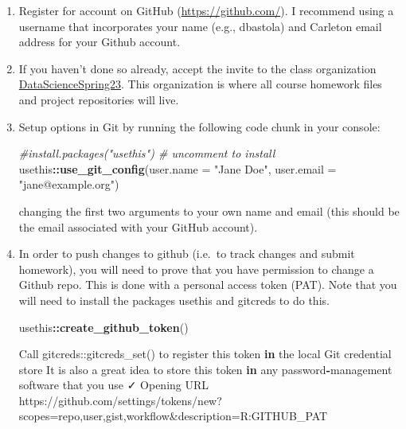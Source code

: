 \documentclass[
]{book}
\newenvironment{Shaded}{\begin{snugshade}}{\end{snugshade}}
\newcommand{\AttributeTok}[1]{\textcolor[rgb]{0.13,0.29,0.53}{#1}}
\newcommand{\CommentTok}[1]{\textcolor[rgb]{0.56,0.35,0.01}{\textit{#1}}}
\newcommand{\ControlFlowTok}[1]{\textcolor[rgb]{0.13,0.29,0.53}{\textbf{#1}}}
\newcommand{\FunctionTok}[1]{\textcolor[rgb]{0.13,0.29,0.53}{\textbf{#1}}}
\newcommand{\NormalTok}[1]{#1}
\newcommand{\SpecialCharTok}[1]{\textcolor[rgb]{0.81,0.36,0.00}{\textbf{#1}}}
\newcommand{\StringTok}[1]{\textcolor[rgb]{0.31,0.60,0.02}{#1}}
\begin{document}
\begin{enumerate}
\def\labelenumi{\arabic{enumi}.}
\item
  Register for account on GitHub (\url{https://github.com/}). I recommend
  using a username that incorporates your name (e.g., dbastola) and Carleton email address for your Github account.
\item
  If you haven't done so already, accept the invite to the class organization \href{https://github.com/DataScienceSpring23}{DataScienceSpring23}. This organization is where all course homework files and project repositories will live.
\item
  Setup options in Git by running the following code chunk in your
  console:

\begin{Shaded}
\begin{Highlighting}[]
\CommentTok{\#install.packages("usethis")  \# uncomment to install}
\NormalTok{usethis}\SpecialCharTok{::}\FunctionTok{use\_git\_config}\NormalTok{(}\AttributeTok{user.name =} \StringTok{"Jane Doe"}\NormalTok{, }\AttributeTok{user.email =} \StringTok{"jane@example.org"}\NormalTok{)}
\end{Highlighting}
\end{Shaded}

  changing the first two arguments to your own name and email (this should
  be the email associated with your GitHub account).
\item
  In order to push changes to github (i.e.~to track changes and submit homework), you will need to prove that you have permission to change a Github repo. This is done with a personal access token (PAT). Note that you will need to install the packages usethis and gitcreds to do this.

\begin{Shaded}
\begin{Highlighting}[]
\NormalTok{usethis}\SpecialCharTok{::}\FunctionTok{create\_github\_token}\NormalTok{()}
\end{Highlighting}
\end{Shaded}

\begin{Shaded}
\begin{Highlighting}[]
\NormalTok{ Call }\StringTok{\textasciigrave{}}\AttributeTok{gitcreds::gitcreds\_set()}\StringTok{\textasciigrave{}}\NormalTok{ to register this token }\ControlFlowTok{in}\NormalTok{ the local Git credential store}
\NormalTok{ It is also a great idea to store this token }\ControlFlowTok{in}\NormalTok{ any password}\SpecialCharTok{{-}}\NormalTok{management software that you use}
\NormalTok{ ✓ Opening URL }\StringTok{\textquotesingle{}https://github.com/settings/tokens/new?scopes=repo,user,gist,workflow\&description=R:GITHUB\_PAT\textquotesingle{}}
\end{Highlighting}
\end{Shaded}


\end{enumerate}
\end{document}
